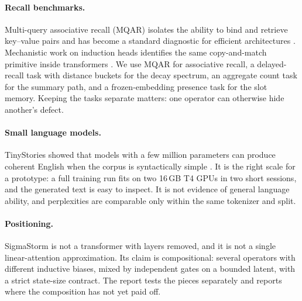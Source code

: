 \paragraph{Recall benchmarks.}
Multi-query associative recall (MQAR) isolates the ability to bind and retrieve key--value
pairs and has become a standard diagnostic for efficient architectures
\citep{arora2023zoology}. Mechanistic work on induction heads identifies the same
copy-and-match primitive inside transformers \citep{olsson2022induction}. We use MQAR for
associative recall, a delayed-recall task with distance buckets for the decay spectrum, an
aggregate count task for the summary path, and a frozen-embedding presence task for the slot
memory. Keeping the tasks separate matters: one operator can otherwise hide another's defect.

\paragraph{Small language models.}
TinyStories showed that models with a few million parameters can produce coherent English
when the corpus is syntactically simple \citep{eldan2023tinystories}. It is the right scale
for a prototype: a full training run fits on two 16\,GB T4 GPUs in two short sessions, and the
generated text is easy to inspect. It is not evidence of general language ability, and
perplexities are comparable only within the same tokenizer and split.

\paragraph{Positioning.}
SigmaStorm is not a transformer with layers removed, and it is not a single linear-attention
approximation. Its claim is compositional: several operators with different inductive biases,
mixed by independent gates on a bounded latent, with a strict state-size contract. The report
tests the pieces separately and reports where the composition has not yet paid off.
